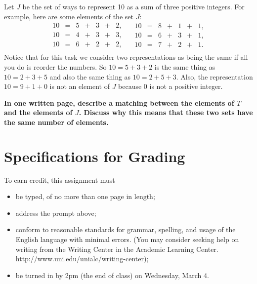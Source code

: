 \documentclass[12pt,letterpaper]{article}
\begin{document}
Let $J$ be the set of ways to represent 10 as a sum of three positive integers.
For example, here are some elements of the set $J$:
\begin{equation*}
\begin{array}{ccccccc}
10 & =& 5 &+& 3 &+& 2, \\
10 & =& 4 &+& 3 &+& 3,\\
10 & =& 6 & +&2 &+& 2, \\
\end{array}
\quad
\begin{array}{ccccccc}
10 & =& 8 &+& 1 &+& 1, \\
10 & =& 6 &+& 3 &+& 1,\\
10 & =& 7 & +&2 &+& 1. \\
\end{array}
\end{equation*}
Notice that for this task we consider two representations as being the same if all you do is reorder the numbers.
So $10 = 5 + 3 +2$ is the same thing as $10 = 2 + 3 + 5$ and also the same thing as $10 = 2 + 5 + 3$.
Also, the representation $10 = 9 + 1 + 0$ is not an element of $J$ because $0$ is not a positive integer.

\textbf{In one written page, describe a matching between the elements of $T$ and the elements of $J$.
Discuss why this means that these two sets have the same number of elements.}


\section*{Specifications for Grading}

To earn credit, this assignment must
\begin{itemize}
\item be typed, of no more than one page in length;
\item address the prompt above;
\item conform to reasonable standards for grammar, spelling, and usage of the English language with minimal errors. (You may consider seeking help on writing from the Writing Center in the Academic Learning Center. http://www.uni.edu/unialc/writing-center);
\item be turned in by 2pm (the end of class) on Wednesday, March 4.
\end{itemize}
\end{document}

